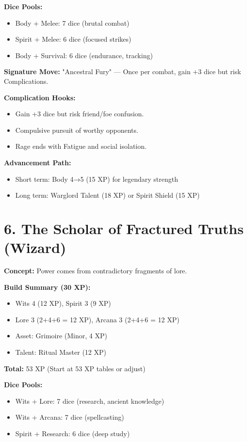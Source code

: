\begin{itemize}
\textbf{Dice Pools:}
\begin{itemize}
  \item Body + Melee: 7 dice (brutal combat)
  \item Spirit + Melee: 6 dice (focused strikes)
  \item Body + Survival: 6 dice (endurance, tracking)
\end{itemize}

\textbf{Signature Move:} "Ancestral Fury" — Once per combat, gain +3 dice but risk Complications.

\textbf{Complication Hooks:}
\begin{itemize}
  \item Gain +3 dice but risk friend/foe confusion.
  \item Compulsive pursuit of worthy opponents.
  \item Rage ends with Fatigue and social isolation.
\end{itemize}

\textbf{Advancement Path:}
\begin{itemize}
  \item Short term: Body 4→5 (15 XP) for legendary strength
  \item Long term: Warglord Talent (18 XP) or Spirit Shield (15 XP)
\end{itemize}

\section{6. The Scholar of Fractured Truths (Wizard)}

\textbf{Concept:} Power comes from contradictory fragments of lore.

\textbf{Build Summary (30 XP):}
\begin{itemize}
  \item Wits 4 (12 XP), Spirit 3 (9 XP)
  \item Lore 3 (2+4+6 = 12 XP), Arcana 3 (2+4+6 = 12 XP)
  \item Asset: Grimoire (Minor, 4 XP)
  \item Talent: Ritual Master (12 XP)
\end{itemize}
\textbf{Total:} 53 XP (Start at 53 XP tables or adjust)

\textbf{Dice Pools:}
\begin{itemize}
  \item Wits + Lore: 7 dice (research, ancient knowledge)
  \item Wits + Arcana: 7 dice (spellcasting)
  \item Spirit + Research: 6 dice (deep study)
\end{itemize}


\end{itemize}
